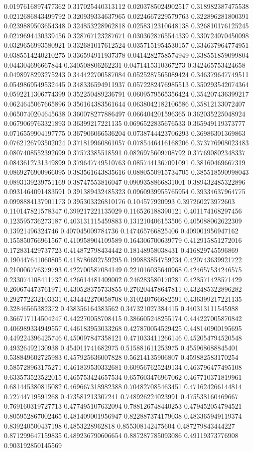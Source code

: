 \begin{table}
\begin{tabu}
\begin{sparkline}{10}
0.0197616897477362 0.317025440313112 0.0203785024902517 0.318982387475538 0.0212686843499792 0.320939334637965 0.0224667229579763 0.322896281800391 0.0239889503654348 0.324853228962818 0.0258312310648138 0.326810176125245 0.0279694430339456 0.328767123287671 0.0303628765544339 0.330724070450098 0.0329656993580921 0.332681017612524 0.0357151954530157 0.334637964774951 0.0385514240210275 0.336594911937378 0.0414282758574949 0.338551859099804 0.044304696667844 0.340508806262231 0.0471415310367273 0.342465753424658 0.0498978293275243 0.344422700587084 0.0525287565089424 0.346379647749511 0.0549869549532445 0.348336594911937 0.0572282476985513 0.350293542074364 0.0592211306774399 0.352250489236791 0.0609579565356424 0.354207436399217 0.0624645067665896 0.356164383561644 0.0638042182106586 0.35812133072407 0.0650740204645638 0.360078277886497 0.066404201596365 0.362035225048924 0.0679069763321893 0.36399217221135 0.0696522835676533 0.365949119373777 0.0716559904197775 0.367906066536204 0.0738744423706293 0.36986301369863 0.0762126793502024 0.371819960861057 0.0785446416168206 0.373776908023483 0.0807408552392699 0.37573385518591 0.0826975609708792 0.377690802348337 0.0843612731349899 0.379647749510763 0.0857441367091091 0.38160469667319 0.0869276900966095 0.383561643835616 0.0880550915734705 0.385518590998043 0.0893139239751169 0.38747553816047 0.0909358866831001 0.389432485322896 0.0931464091483591 0.391389432485323 0.0960939955765954 0.39334637964775 0.0998884137901173 0.395303326810176 0.104577920993 0.397260273972603 0.110147821578347 0.399217221135029 0.116526188390121 0.401174168297456 0.123595736273187 0.403131115459883 0.131210406153506 0.405088062622309 0.13921496324746 0.407045009784736 0.147465766825406 0.409001956947162 0.155850766961567 0.410958904109589 0.164306700639779 0.412915851272016 0.172831429737723 0.414872798434442 0.18148958038431 0.416829745596869 0.190447641060805 0.418786692759295 0.199883854759234 0.420743639921722 0.210006776379793 0.422700587084149 0.221016035640968 0.424657534246575 0.233074108411732 0.426614481409002 0.246283580170281 0.428571428571429 0.260674473761971 0.430528375733855 0.276204478647811 0.432485322896282 0.292772232103331 0.434442270058708 0.310240766682591 0.436399217221135 0.32846565382372 0.438356164383562 0.347321027384415 0.440313111545988 0.366717114504247 0.442270058708415 0.386605248255174 0.444227005870842 0.406989334949557 0.446183953033268 0.427870054529425 0.448140900195695 0.449224396425746 0.450097847358121 0.471033411266146 0.452054794520548 0.49326492130938 0.454011741682975 0.515881611253975 0.455968688845401 0.538849602725983 0.457925636007828 0.56214135906807 0.459882583170254 0.585728963175271 0.461839530332681 0.609567625249134 0.463796477495108 0.633573523522015 0.465753424657534 0.657603476967062 0.467710371819961 0.681445380815082 0.469667318982388 0.704827085463451 0.471624266144814 0.72744719591268 0.473581213307241 0.748926224023991 0.475538160469667 0.769160319727713 0.477495107632094 0.788126748440253 0.479452054794521 0.805952867002465 0.481409001956947 0.822887374179038 0.483365949119374 0.839240500437198 0.4853228962818 0.855308142475604 0.487279843444227 0.871299647159835 0.489236790606654 0.887287785093086 0.49119373776908 0.903192850145569 
\end{sparkline}
\end{tabu}
\end{table}
